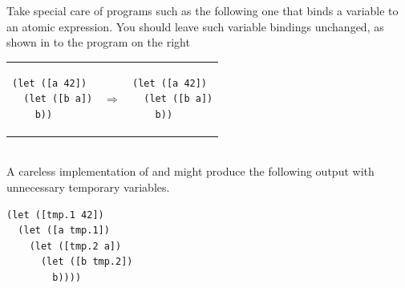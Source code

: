 \documentclass[11pt]{book}
\begin{document}
Take special care of programs such as the following one that binds a
variable to an atomic expression. You should leave such variable
bindings unchanged, as shown in to the program on the right \\
\begin{tabular}{lll}
\begin{minipage}{0.4\textwidth}
\begin{lstlisting}
(let ([a 42])
  (let ([b a])
    b))
\end{lstlisting}
\end{minipage}
&
$\Rightarrow$
&
\begin{minipage}{0.4\textwidth}
\begin{lstlisting}
(let ([a 42])
  (let ([b a])
    b))
\end{lstlisting}
\end{minipage}
\end{tabular} \\
A careless implementation of  and  might
produce the following output with unnecessary temporary variables.\\
\begin{minipage}{0.4\textwidth}
\begin{lstlisting}
(let ([tmp.1 42])
  (let ([a tmp.1])
    (let ([tmp.2 a])
      (let ([b tmp.2])
        b))))
\end{lstlisting}
\end{minipage}
\end{document}
